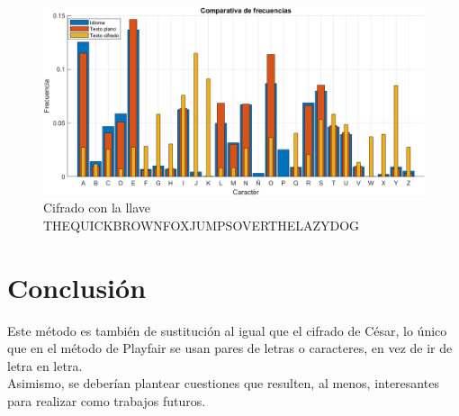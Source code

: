 \documentclass[10pt]{article}
\begin{document}
\begin{figure}[!ht]
  \centering
  \includegraphics[width=1\textwidth]{PlayFair_THEQUICKBROWNFOXJUMPSOVERTHELAZYDOG}
  \caption{Cifrado con la llave THEQUICKBROWNFOXJUMPSOVERTHELAZYDOG}
  \label{fig_sim}
\end{figure}

\par\vspace{\baselineskip}

\section{Conclusión}
\justify
Este método es también de sustitución al igual que el cifrado de César, lo único que en el método de Playfair se
usan pares de letras o caracteres, en vez de ir de letra en letra.\\
Asimismo, se deberían plantear cuestiones que resulten, al menos, interesantes para
realizar como trabajos futuros.

 
 

\par\vspace{\baselineskip}
\end{document}
